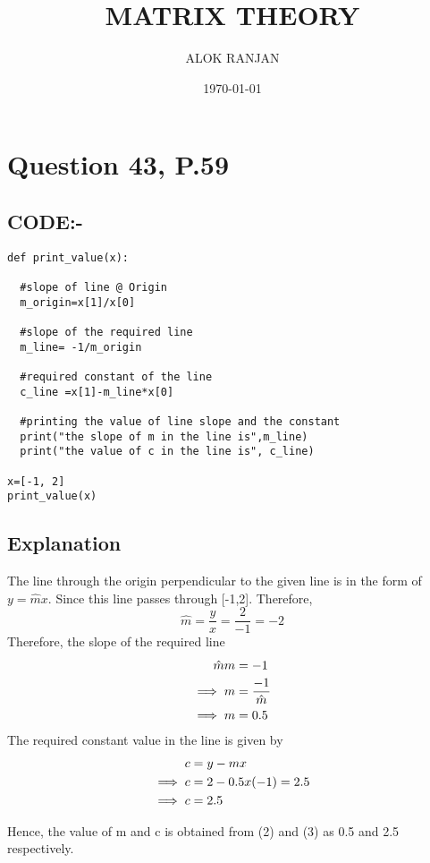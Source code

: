 \documentclass[letterpaper,12pt]{article}
\begin{document}
\title{MATRIX THEORY}
\author{ALOK RANJAN}
\date{\today}
\maketitle

\section{Question 43, P.59}
\subsection{CODE:-}
\begin{verbatim}
def print_value(x):
  
  #slope of line @ Origin
  m_origin=x[1]/x[0]
  
  #slope of the required line 
  m_line= -1/m_origin
  
  #required constant of the line
  c_line =x[1]-m_line*x[0]
  
  #printing the value of line slope and the constant
  print("the slope of m in the line is",m_line)
  print("the value of c in the line is", c_line)

x=[-1, 2]
print_value(x)
\end{verbatim}

\subsection{Explanation}
The line through the origin perpendicular to the given line is in the form of $ y=\hat{m}x$. 
Since this line passes through [-1,2]. Therefore, \\
\begin{equation}
    \hat{m}= \frac{y}{x} = \frac{2}{-1} = -2
\end{equation}
 Therefore, the slope of the required line
\begin{align}
\hat{m}m &= -1\notag\\
\implies m &= \frac{-1}{\hat{m}}\notag\\
\implies m &=0.5
\end{align}
The required constant value in the line is given by
\begin{align}
    c &= y-mx\notag\\
    \implies c &= 2-0.5x(-1)=2.5  \notag\\
    \implies c &=2.5
\end{align}

Hence, the value of m and c is obtained from (2) and (3) as 0.5 and 2.5 respectively.

    
\end{document}
